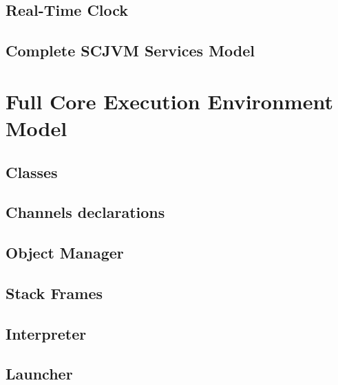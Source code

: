 \documentclass[a4paper,10pt]{report}
\begin{document}
\section{Real-Time Clock}


\section{Complete SCJVM Services Model}


\chapter{Full Core Execution Environment Model}
\label{full-cee-model}

\section{Classes}


\section{Channels declarations}
\label{cee-model-channels}





\section{Object Manager}
\label{object-manager-appendix}


\section{Stack Frames}


\section{Interpreter}
\label{interpreter-appendix}





\section{Launcher}
\label{launcher-appendix}

\end{document}
